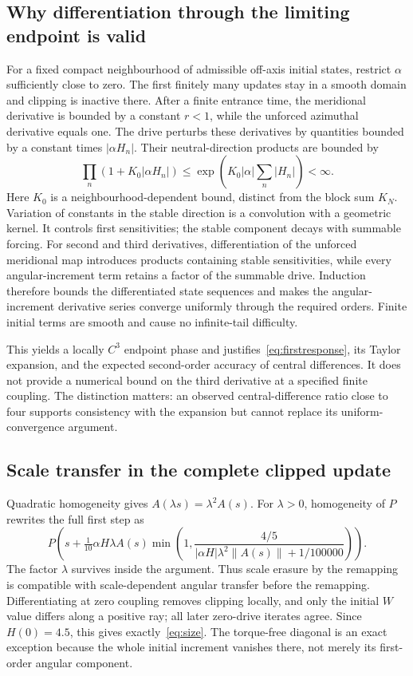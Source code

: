 \documentclass[11pt,a4paper]{article}
\numberwithin{equation}{section}
\begin{document}
\subsection{Why differentiation through the limiting endpoint is valid}
For a fixed compact neighbourhood of admissible off-axis initial states, restrict $\alpha$ sufficiently close to zero. The first finitely many updates stay in a smooth domain and clipping is inactive there. After a finite entrance time, the meridional derivative is bounded by a constant $r<1$, while the unforced azimuthal derivative equals one. The drive perturbs these derivatives by quantities bounded by a constant times $|\alpha H_n|$. Their neutral-direction products are bounded by
\begin{equation}\label{eq:product}
\prod_n(1+K_0|\alpha H_n|)\le
\exp\left(K_0|\alpha|\sum_n|H_n|\right)<\infty.
\end{equation}
Here $K_0$ is a neighbourhood-dependent bound, distinct from the block sum $K_N$. Variation of constants in the stable direction is a convolution with a geometric kernel. It controls first sensitivities; the stable component decays with summable forcing. For second and third derivatives, differentiation of the unforced meridional map introduces products containing stable sensitivities, while every angular-increment term retains a factor of the summable drive. Induction therefore bounds the differentiated state sequences and makes the angular-increment derivative series converge uniformly through the required orders. Finite initial terms are smooth and cause no infinite-tail difficulty.

This yields a locally $C^3$ endpoint phase and justifies~\eqref{eq:firstresponse}, its Taylor expansion, and the expected second-order accuracy of central differences. It does not provide a numerical bound on the third derivative at a specified finite coupling. The distinction matters: an observed central-difference ratio close to four supports consistency with the expansion but cannot replace its uniform-convergence argument.

\subsection{Scale transfer in the complete clipped update}
Quadratic homogeneity gives $A(\lambda s)=\lambda^2A(s)$. For $\lambda>0$, homogeneity of $P$ rewrites the full first step as
\begin{equation}\label{eq:fullscale}
P\left(s+\tfrac1{10}\alpha H\lambda A(s)
\min\left(1,\frac{4/5}{|\alpha H|\lambda^2\|A(s)\|+1/100000}\right)\right).
\end{equation}
The factor $\lambda$ survives inside the argument. Thus scale erasure by the remapping is compatible with scale-dependent angular transfer before the remapping. Differentiating at zero coupling removes clipping locally, and only the initial $W$ value differs along a positive ray; all later zero-drive iterates agree. Since $H(0)=4.5$, this gives exactly~\eqref{eq:size}. The torque-free diagonal is an exact exception because the whole initial increment vanishes there, not merely its first-order angular component.
\end{document}

